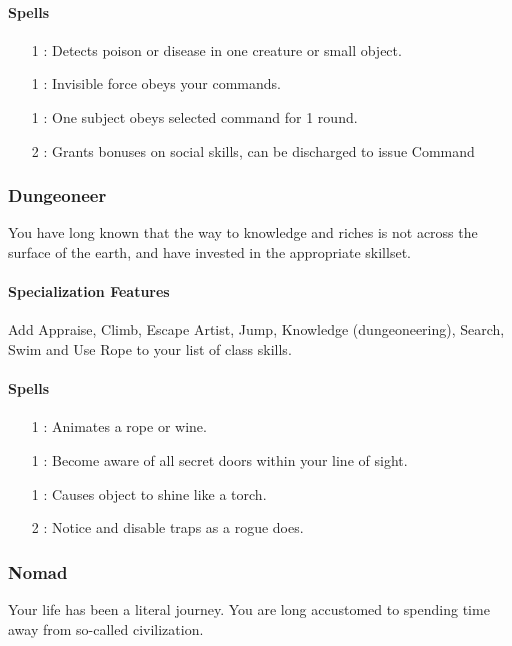 \paragraph{Spells}
\begin{itemize}
 \item[1] : Detects poison or disease in one creature or small object.
 \item[1] : Invisible force obeys your commands.
 \item[1] : One subject obeys selected command for 1 round.
 \item[2] : Grants bonuses on social skills, can be discharged to issue Command
\end{itemize}

\subsubsection{Dungeoneer}
You have long known that the way to knowledge and riches is not across the surface of the earth, and have invested in the appropriate skillset.
\paragraph{Specialization Features}
Add Appraise, Climb, Escape Artist, Jump, Knowledge (dungeoneering), Search, Swim and Use Rope to your list of class skills.
\paragraph{Spells}
\begin{itemize}
 \item[1] : Animates a rope or wine.
 \item[1] : Become aware of all secret doors within your line of sight.
 \item[1] : Causes object to shine like a torch.
 \item[2] : Notice and disable traps as a rogue does.
\end{itemize}

\subsubsection{Nomad}
Your life has been a literal journey. You are long accustomed to spending time away from so-called civilization.
